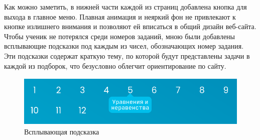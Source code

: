 \documentclass[a4paper, 12pt]{extarticle}
\begin{document}
Как можно заметить, в нижней части каждой из страниц добавлена кнопка для
выхода в главное меню. Плавная анимация и неяркий фон не привлекают к кнопке
излишнего внимания и позволяют ей вписаться в общий дизайн веб-сайта.
\\

Чтобы ученик не потерялся среди номеров заданий, мною были добавлены
всплывающие подсказки под каждым из чисел, обозначающих номер задания. Эти
подсказки содержат краткую тему, по которой будут представлены задачи в каждой
из подборок, что безусловно облегчит ориентирование по сайту.

\begin{figure}[h]
    \centering
    \includegraphics[height=70pt]{./img/tooltip.png}
    \caption{Всплывающая подсказка}
\end{figure}
\newpage
\end{document}
